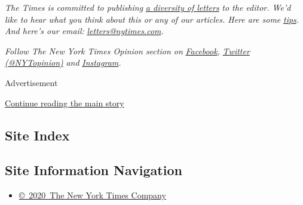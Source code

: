 \emph{The Times is committed to publishing}
\href{https://www.nytimes.com/2019/01/31/opinion/letters/letters-to-editor-new-york-times-women.html}{\emph{a
diversity of letters}} \emph{to the editor. We'd like to hear what you
think about this or any of our articles. Here are some}
\href{https://help.nytimes.com/hc/en-us/articles/115014925288-How-to-submit-a-letter-to-the-editor}{\emph{tips}}\emph{.
And here's our email:}
\href{mailto:letters@nytimes.com}{\emph{letters@nytimes.com}}\emph{.}

\emph{Follow The New York Times Opinion section on}
\href{https://www.facebook.com/nytopinion}{\emph{Facebook}}\emph{,}
\href{http://twitter.com/NYTOpinion}{\emph{Twitter (@NYTopinion)}}
\emph{and}
\href{https://www.instagram.com/nytopinion/}{\emph{Instagram}}\emph{.}

Advertisement

\protect\hyperlink{after-bottom}{Continue reading the main story}

\hypertarget{site-index}{%
\subsection{Site Index}\label{site-index}}

\hypertarget{site-information-navigation}{%
\subsection{Site Information
Navigation}\label{site-information-navigation}}

\begin{itemize}
\tightlist
\item
  \href{https://help.nytimes.com/hc/en-us/articles/115014792127-Copyright-notice}{©~2020~The
  New York Times Company}
\end{itemize}

